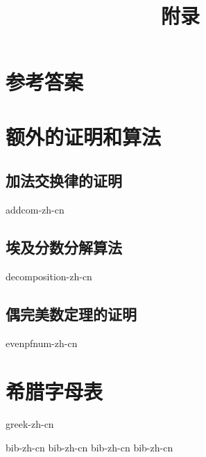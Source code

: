 \documentclass[b5paper]{ctexart}
\begin{document}
\title{附录}

\maketitle
\fi

\chapter{参考答案}
\label{ch:answers}
\shipoutAnswer

\chapter{额外的证明和算法}

\section{加法交换律的证明}
{addcom-zh-cn}

\section{埃及分数分解算法}
{decomposition-zh-cn}

\section{偶完美数定理的证明}
{evenpfnum-zh-cn}

\chapter{希腊字母表} \label{ch:greek-letters}
{greek-zh-cn}

\markboth{\bibname}{}

\begin{thebibliography}{99}
  {bib-zh-cn}
  {bib-zh-cn}
  {bib-zh-cn}
  {bib-zh-cn}
\end{thebibliography}

\ifx\wholebook\relax \else
\expandafter\enddocument
\fi
\end{document}
